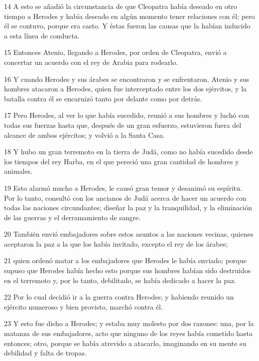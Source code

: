 \par 14 A esto se añadió la circunstancia de que Cleopatra había deseado en otro tiempo a Herodes y había deseado en algún momento tener relaciones con él; pero él se contuvo, porque era casto. Y éstas fueron las causas que la habían inducido a esta línea de conducta.

\par 15 Entonces Atenio, llegando a Herodes, por orden de Cleopatra, envió a concertar un acuerdo con el rey de Arabia para rodearlo.

\par 16 Y cuando Herodes y sus árabes se encontraron y se enfrentaron, Atenio y sus hombres atacaron a Herodes, quien fue interceptado entre los dos ejércitos, y la batalla contra él se encarnizó tanto por delante como por detrás.

\par 17 Pero Herodes, al ver lo que había sucedido, reunió a sus hombres y luchó con todas sus fuerzas hasta que, después de un gran esfuerzo, estuvieron fuera del alcance de ambos ejércitos; y volvió a la Santa Casa.

\par 18 Y hubo un gran terremoto en la tierra de Judá, como no había sucedido desde los tiempos del rey Harba, en el que pereció una gran cantidad de hombres y animales.

\par 19 Esto alarmó mucho a Herodes, le causó gran temor y desanimó su espíritu. Por lo tanto, consultó con los ancianos de Judá acerca de hacer un acuerdo con todas las naciones circundantes; diseñar la paz y la tranquilidad, y la eliminación de las guerras y el derramamiento de sangre.

\par 20 También envió embajadores sobre estos asuntos a las naciones vecinas, quienes aceptaron la paz a la que los había invitado, excepto el rey de los árabes;

\par 21 quien ordenó matar a los embajadores que Herodes le había enviado; porque supuso que Herodes había hecho esto porque sus hombres habían sido destruidos en el terremoto y, por lo tanto, debilitado, se había dedicado a hacer la paz.

\par 22 Por lo cual decidió ir a la guerra contra Herodes; y habiendo reunido un ejército numeroso y bien provisto, marchó contra él.

\par 23 Y esto fue dicho a Herodes; y estaba muy molesto por dos razones: una, por la matanza de sus embajadores, acto que ninguno de los reyes había cometido hasta entonces; otro, porque se había atrevido a atacarlo, imaginando en su mente su debilidad y falta de tropas.

